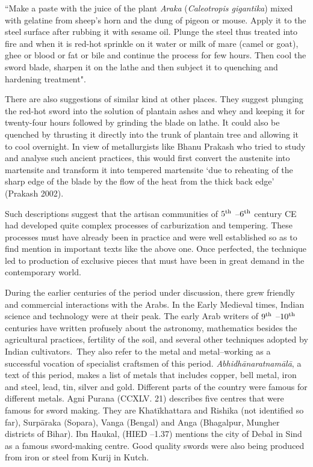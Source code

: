 ``Make a paste with the juice of the plant {\it Araka} ({\it Caleotropis gigantika}) mixed with gelatine from sheep's horn and the dung of pigeon or mouse. Apply it to the steel surface after rubbing it with sesame oil. Plunge the steel thus treated into fire and when it is red-hot sprinkle on it water or milk of mare (camel or goat), ghee or blood or fat or bile and continue the process for few hours. Then cool the sword blade, sharpen it on the lathe and then subject it to quenching and hardening treatment".

There are also suggestions of similar kind at other places. They suggest plunging the red-hot sword into the solution of plantain ashes and whey and keeping it for twenty-four hours followed by grinding the blade on lathe. It could also be quenched by thrusting it directly into the trunk of plantain tree and allowing it to cool overnight. In view of metallurgists like Bhanu Prakash who tried to study and analyse such ancient practices, this would first convert the austenite into martensite and transform it into tempered martensite `due to reheating of the sharp edge of the blade by the flow of the heat from the thick back edge' (Prakash 2002).

Such descriptions suggest that the artisan communities of $5^{\rm th}$ –$6^{\rm th}$ century CE had developed quite complex processes of carburization and tempering. These processes must have already been in practice and were well established so as to find mention in important texts like the above one. Once perfected, the technique led to production of exclusive pieces that must have been in great demand in the contemporary world. 

During the earlier centuries of the period under discussion, there grew friendly and commercial interactions with the Arabs. In the Early Medieval times, Indian science and technology were at their peak. The early Arab writers of $9^{\rm th}$ –$10^{\rm th}$ centuries have written profusely about the astronomy, mathematics besides the agricultural practices, fertility of the soil, and several other techniques adopted by Indian cultivators.~They also refer to the metal and metal–working as a successful vocation of specialist craftsmen of this period. \textit{Abhidhānaratnamālā}, a text of this period, makes a list of metals that includes copper, bell metal, iron and steel, lead, tin, silver and gold. Different parts of the country were famous for different metals. Agni Purana (CCXLV. 21) describes five centres that were famous for sword making. They are Khatīkhattara and Rishika (not identified so far), Surpāraka (Sopara), Vanga (Bengal) and Anga (Bhagalpur, Mungher districts of Bihar). Ibn Haukal, (HIED –1.37) mentions the city of Debal in Sind as a famous sword-making centre. Good quality swords were also being produced from iron or steel from Kurij in Kutch. 

